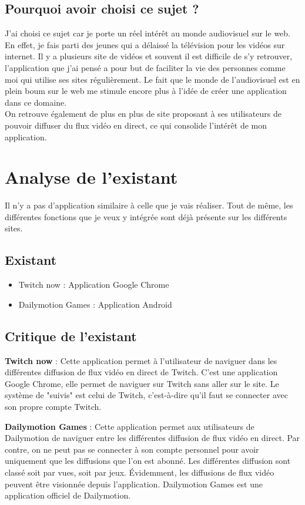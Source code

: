 \documentclass[11pt]{report} %
\begin{document}
		\subsection{Pourquoi avoir choisi ce sujet ?}
		J'ai choisi ce sujet car je porte un réel intérêt au monde audiovisuel sur le web. En effet, je fais parti des jeunes qui a délaissé la télévision pour les vidéos sur internet. Il y a plusieurs site de vidéos et souvent il est difficile de s'y retrouver, l'application que j'ai pensé a pour but de faciliter la vie des personnes comme moi qui utilise ses sites régulièrement. Le fait que le monde de l'audiovisuel est en plein boum sur le web me stimule encore plus à l'idée de créer une application dans ce domaine. \\
		On retrouve également de plus en plus de site proposant à ses utilisateurs de pouvoir diffuser du flux vidéo en direct, ce qui consolide l'intérêt de mon application.

	\section{Analyse de l'existant}
	Il n'y a pas d'application similaire à celle que je vais réaliser. Tout de même, les différentes fonctions que je veux y intégrée sont déjà présente sur les différents sites.
		\subsection{Existant}
		\begin{itemize}
			\item Twitch now : Application Google Chrome
			\item Dailymotion Games : Application Android
		\end{itemize}			
		\subsection{Critique de l'existant}	
		\textbf{Twitch now} : Cette application permet à l'utilisateur de naviguer dans les différentes diffusion de flux vidéo en direct de Twitch. C'est une application Google Chrome, elle permet de naviguer sur Twitch sans aller sur le site. Le système de "suivis" est celui de Twitch, c'est-à-dire qu'il faut se connecter avec son propre compte Twitch.
		
		\textbf{Dailymotion Games} : Cette application permet aux utilisateurs de Dailymotion de naviguer entre les différentes diffusion de flux vidéo en direct. Par contre, on ne peut pas se connecter à son compte personnel pour avoir uniquement que les diffusions que l'on est abonné. Les différentes diffusion sont classé soit par vues, soit par jeux. Évidemment, les diffusions de flux vidéo peuvent être visionnée depuis l'application.
		Dailymotion Games est une application officiel de Dailymotion.
		
\end{document}
